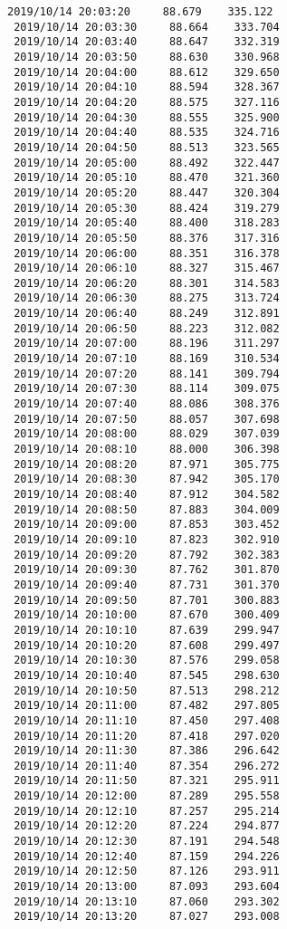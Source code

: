 \documentclass[11pt]{article}
\begin{document}
\begin{Verbatim}[commandchars=\\\{\}]
 2019/10/14 20:03:20     88.679    335.122
 2019/10/14 20:03:30     88.664    333.704
 2019/10/14 20:03:40     88.647    332.319
 2019/10/14 20:03:50     88.630    330.968
 2019/10/14 20:04:00     88.612    329.650
 2019/10/14 20:04:10     88.594    328.367
 2019/10/14 20:04:20     88.575    327.116
 2019/10/14 20:04:30     88.555    325.900
 2019/10/14 20:04:40     88.535    324.716
 2019/10/14 20:04:50     88.513    323.565
 2019/10/14 20:05:00     88.492    322.447
 2019/10/14 20:05:10     88.470    321.360
 2019/10/14 20:05:20     88.447    320.304
 2019/10/14 20:05:30     88.424    319.279
 2019/10/14 20:05:40     88.400    318.283
 2019/10/14 20:05:50     88.376    317.316
 2019/10/14 20:06:00     88.351    316.378
 2019/10/14 20:06:10     88.327    315.467
 2019/10/14 20:06:20     88.301    314.583
 2019/10/14 20:06:30     88.275    313.724
 2019/10/14 20:06:40     88.249    312.891
 2019/10/14 20:06:50     88.223    312.082
 2019/10/14 20:07:00     88.196    311.297
 2019/10/14 20:07:10     88.169    310.534
 2019/10/14 20:07:20     88.141    309.794
 2019/10/14 20:07:30     88.114    309.075
 2019/10/14 20:07:40     88.086    308.376
 2019/10/14 20:07:50     88.057    307.698
 2019/10/14 20:08:00     88.029    307.039
 2019/10/14 20:08:10     88.000    306.398
 2019/10/14 20:08:20     87.971    305.775
 2019/10/14 20:08:30     87.942    305.170
 2019/10/14 20:08:40     87.912    304.582
 2019/10/14 20:08:50     87.883    304.009
 2019/10/14 20:09:00     87.853    303.452
 2019/10/14 20:09:10     87.823    302.910
 2019/10/14 20:09:20     87.792    302.383
 2019/10/14 20:09:30     87.762    301.870
 2019/10/14 20:09:40     87.731    301.370
 2019/10/14 20:09:50     87.701    300.883
 2019/10/14 20:10:00     87.670    300.409
 2019/10/14 20:10:10     87.639    299.947
 2019/10/14 20:10:20     87.608    299.497
 2019/10/14 20:10:30     87.576    299.058
 2019/10/14 20:10:40     87.545    298.630
 2019/10/14 20:10:50     87.513    298.212
 2019/10/14 20:11:00     87.482    297.805
 2019/10/14 20:11:10     87.450    297.408
 2019/10/14 20:11:20     87.418    297.020
 2019/10/14 20:11:30     87.386    296.642
 2019/10/14 20:11:40     87.354    296.272
 2019/10/14 20:11:50     87.321    295.911
 2019/10/14 20:12:00     87.289    295.558
 2019/10/14 20:12:10     87.257    295.214
 2019/10/14 20:12:20     87.224    294.877
 2019/10/14 20:12:30     87.191    294.548
 2019/10/14 20:12:40     87.159    294.226
 2019/10/14 20:12:50     87.126    293.911
 2019/10/14 20:13:00     87.093    293.604
 2019/10/14 20:13:10     87.060    293.302
 2019/10/14 20:13:20     87.027    293.008

\end{Verbatim}
\end{document}

